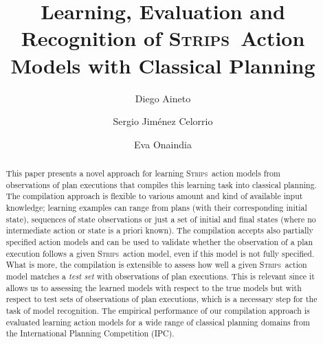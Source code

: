 \documentclass[3p,times]{elsarticle}
\newcommand{\strips}{\textsc{Strips}}     %
\begin{document}
\begin{frontmatter}



\dochead{}

\title{Learning, Evaluation and Recognition of \strips\ Action Models with Classical Planning}
\author[label1]{Diego Aineto}
\author[label1]{Sergio Jim\'{e}nez Celorrio}
\author[label1]{Eva Onaindia}
\address[label1]{Department of Computer Systems and Computation, Universitat Polit\`ecnica de Val\`encia. Spain}




\begin{abstract}
  This paper presents a novel approach for learning \strips\ action models from observations of plan executions that compiles this learning task into classical planning. The compilation approach is flexible to various amount and kind of available input knowledge; learning examples can range from plans (with their corresponding initial state), sequences of state observations or just a set of initial and final states (where no intermediate action or state is a priori known). The compilation accepts also partially specified action models and can be used to validate whether the observation of a plan execution follows a given \strips\ action model, even if this model is not fully specified. What is more, the compilation is extensible to assess how well a given \strips\ action model matches a {\em test set} with observations of plan executions. This is relevant since it allows us to assessing the learned models with respect to the true models but with respect to test sets of observations of plan executions, which is a necessary step for the task of model recognition. The empirical performance of our compilation approach is evaluated learning action models for a wide range of classical planning domains from the International Planning Competition (IPC). 
\end{abstract}


\end{frontmatter}
\end{document}
